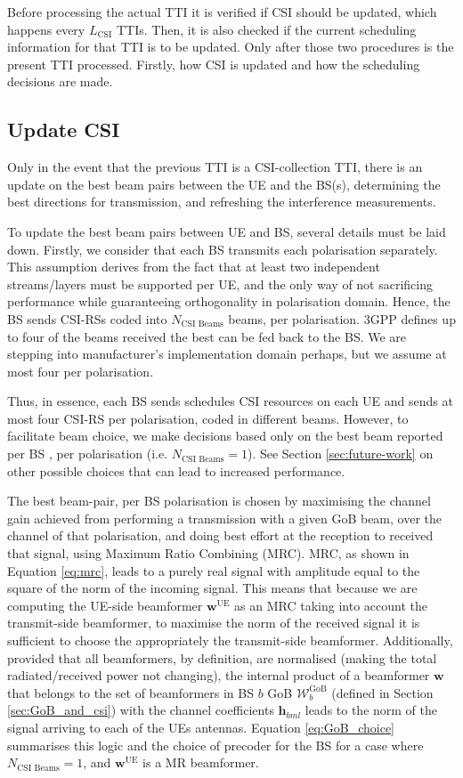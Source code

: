 Before processing the actual TTI it is verified if CSI should be updated, which happens every $L_\text{CSI}$ TTIs. Then, it is also checked if the current scheduling information for that TTI is to be updated. Only after those two procedures is the present TTI processed. Firstly, how CSI is updated and how the scheduling decisions are made.

\subsection{Update CSI}
Only in the event that the previous \ac{TTI} is a \ac{CSI}-collection \ac{TTI}, there is an update on the best beam pairs between the UE and the BS(s), determining the best directions for transmission, and refreshing the interference measurements. 

To update the best beam pairs between UE and BS, several details must be laid down. Firstly, we consider that each BS transmits each polarisation separately. This assumption derives from the fact that at least two independent streams/layers must be supported per UE, and the only way of not sacrificing performance while guaranteeing orthogonality in polarisation domain. Hence, the BS sends CSI-RSs coded into $N_\text{CSI Beams}$ beams, per polarisation. 3GPP defines up to four of the beams received the best can be fed back to the BS. We are stepping into manufacturer's implementation domain perhaps, but we assume at most four per polarisation.

Thus, in essence, each BS sends schedules CSI resources on each UE and sends at most four CSI-RS per polarisation, coded in different beams. However, to facilitate beam choice, we make decisions based only on the best beam reported per BS , per polarisation (i.e. $N_\text{CSI Beams} = 1$). See Section \ref{sec:future-work} on other possible choices that can lead to increased performance.

The best beam-pair, per BS polarisation is chosen by maximising the channel gain achieved from performing a transmission with a given GoB beam, over the channel of that polarisation, and doing best effort at the reception to received that signal, using Maximum Ratio Combining (MRC). MRC, as shown in Equation \eqref{eq:mrc}, leads to a purely real signal with amplitude equal to the square of the norm of the incoming signal. This means that because we are computing the UE-side beamformer $\bm{w}^\text{UE}$ as an MRC taking into account the transmit-side beamformer, to maximise the norm of the received signal it is sufficient to choose the appropriately the transmit-side beamformer. Additionally, provided that all beamformers, by definition, are normalised (making the total radiated/received power not changing), the internal product of a beamformer $\bm{w}$ that belongs to the set of beamformers in BS $b$ \ac{GoB} $\mathcal{W}^\text{GoB}_b$ (defined in Section \ref{sec:GoB_and_csi}) with the channel coefficients $\bm{h}_{b m l}$ leads to the norm of the signal arriving to each of the UEs antennas. Equation \eqref{eq:GoB_choice} summarises this logic and the choice of precoder for the BS for a case where $N_\text{CSI Beams} = 1$, and $\bm{w}^\text{UE}$ is a MR beamformer.

